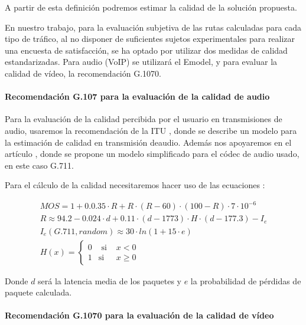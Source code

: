 \documentclass[a4paper,11pt]{book}
\begin{document}
A partir de esta definición podremos estimar la calidad de la solución propuesta.


 En nuestro trabajo, para la evaluación subjetiva de las rutas calculadas para cada tipo de tráfico, al no disponer de suficientes sujetos experimentales para realizar una encuesta de satisfacción, se ha optado por utilizar dos medidas de calidad estandarizadas. Para audio (VoIP) se utilizará el Emodel, y para evaluar la calidad de vídeo, la recomendación G.1070.
 
 \paragraph{Recomendación G.107 para la evaluación de la calidad de audio}
 
  Para la evaluación de la calidad percibida por el usuario en transmisiones de audio, usaremos la recomendación de la \ac{ITU} \cite{g107}, donde se describe un modelo para la estimación de calidad en transmisión deaudio. Además nos apoyaremos en el artículo \cite{ramos2005efficient}, donde se propone un modelo simplificado para el códec de audio usado, en este caso G.711.

Para el cálculo de la calidad necesitaremos hacer uso de las ecuaciones :

\begin{subequations}
\begin{align}
MOS = 1 +0.0.35 \cdot R + R \cdot (R -60) \cdot (100-R) \cdot 7 \cdot 10^{-6}\\
R \approx 94.2 - 0.024 \cdot d + 0.11 \cdot (d - 1773) \cdot H \cdot (d-177.3)-I_{e}\\
I_{e}(G.711, random) \approx 30 \cdot ln(1+15 \cdot e)\\
H(x)= \left\{\begin{matrix} 0 & \mbox{ si }& x<0\\1 & \mbox{si} & x \geq 0 \end{matrix}\right.
\end{align}
\end{subequations}

Donde $d$ será la latencia media de los paquetes y $e$ la probabilidad de pérdidas de paquete calculada.
 
 \paragraph{Recomendación G.1070 para la evaluación de la calidad de vídeo}
 
\end{document}

